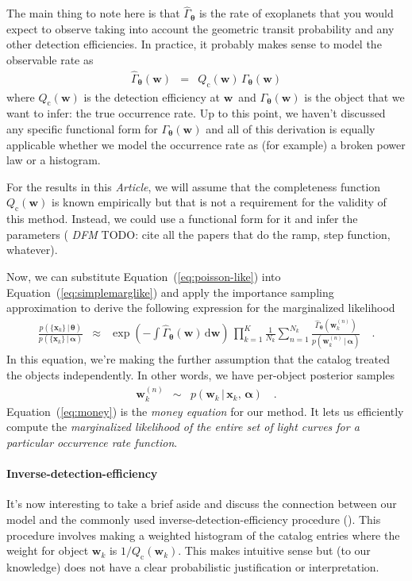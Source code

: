 \documentclass[12pt,preprint]{aastex}
\newcommand{\paper}{\textsl{Article}}
\newcommand{\Eq}[1]{Equation~(\ref{eq:#1})}
\newcommand{\eq}[1]{\Eq{#1}}
\newcommand{\eqlabel}[1]{\label{eq:#1}}
\newcommand{\dd}{\ensuremath{\,\mathrm{d}}}
\newcommand{\bvec}[1]{\ensuremath{\boldsymbol{#1}}}
\newcommand{\todo}[3]{{\color{#2} \emph{#1} TODO: #3}}
\newcommand{\dfmtodo}[1]{\todo{DFM}{red}{#1}}
\newcommand{\rate}{\ensuremath{\Gamma}}
\newcommand{\ratepar}{{\ensuremath{\theta}}}
\newcommand{\ratepars}{{\ensuremath{\bvec{\ratepar}}}}
\newcommand{\obs}[1]{\ensuremath{\hat{#1}}}
\newcommand{\completeness}{{\ensuremath{Q_\mathrm{c}}}}
\newcommand{\data}{{\ensuremath{\bvec{x}}}}
\newcommand{\entry}{{\ensuremath{\bvec{w}}}}
\newcommand{\interim}{{\ensuremath{\bvec{\alpha}}}}
\begin{document}
The main thing to note here is that $\obs{\rate}_\ratepars$ is the rate of
exoplanets that you would expect to observe taking into account the geometric
transit probability and any other detection efficiencies.
In practice, it probably makes sense to model the observable rate as
\begin{eqnarray}
\obs{\rate}_\ratepars(\entry) &=&
    \completeness(\entry)\,\rate_\ratepars(\entry)
\end{eqnarray}
where $\completeness(\entry)$ is the detection efficiency at \entry\ and
$\rate_\ratepars(\entry)$ is the object that we want to infer: the true
occurrence rate.
Up to this point, we haven't discussed any specific functional form for
$\rate_\ratepars(\entry)$ and all of this derivation is equally applicable
whether we model the occurrence rate as (for example) a broken power law or
a histogram.

For the results in this \paper, we will assume that the completeness function
$\completeness(\entry)$ is known empirically but that is not a requirement for
the validity of this method.
Instead, we could use a functional form for it and infer the parameters
(\dfmtodo{cite all the papers that do the ramp, step function, whatever}).

Now, we can substitute \eq{poisson-like} into \eq{simplemarglike} and apply
the importance sampling approximation to derive the following expression for
the marginalized likelihood
\begin{eqnarray}\eqlabel{money}
\frac{p(\{\data_k\}\,|\,\ratepars)}{p(\{\data_k\}\,|\,\interim)} &\approx&
    \exp\left(-\int \obs{\rate}_\ratepars (\entry) \dd\entry\right) \,
    \prod_{k=1}^K
    \frac{1}{N_k} \sum_{n=1}^{N_k}
    \frac{\obs{\rate}_\ratepars (\entry_k^{(n)})}
         {p(\entry_k^{(n)}\,|\,\interim)} \quad.
\end{eqnarray}
In this equation, we're making the further assumption that the catalog treated
the objects independently.
In other words, we have per-object posterior samples
\begin{eqnarray}
\entry_k^{(n)} &\sim& p(\entry_k\,|\,\data_k,\,\interim) \quad.
\end{eqnarray}
\Eq{money} is the \emph{money equation} for our method.
It lets us efficiently compute the \emph{marginalized likelihood of the entire
set of light curves for a particular occurrence rate function}.

\paragraph{Inverse-detection-efficiency}
It's now interesting to take a brief aside and discuss the connection between
our model and the commonly used inverse-detection-efficiency procedure
(\citealt{howard,dressing,petigura}).
This procedure involves making a weighted histogram of the catalog entries
where the weight for object $\entry_k$ is $1/\completeness(\entry_k)$.
This makes intuitive sense but (to our knowledge) does not have a clear
probabilistic justification or interpretation.
\end{document}
